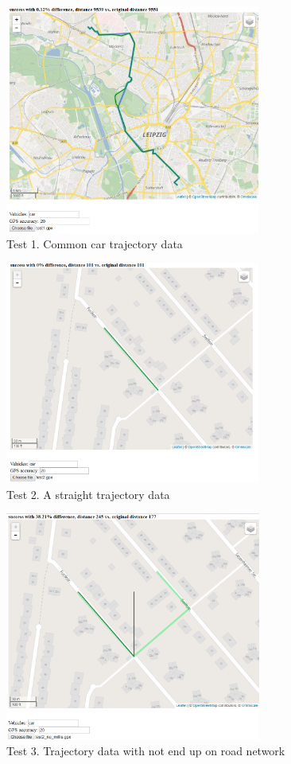 \documentclass[a4paper]{article}
\begin{document}
\begin{figure}
\centering
\includegraphics[width=0.75\textwidth]{fig5.png}
\caption{\label{fig:data} Test 1. Common car trajectory data }
\end{figure}

\begin{figure}
\centering
\includegraphics[width=0.75\textwidth]{fig6.png}
\caption{\label{fig:data} Test 2. A straight trajectory data }
\end{figure}

\begin{figure}
\centering
\includegraphics[width=0.75\textwidth]{fig7.png}
\caption{\label{fig:data} Test 3. Trajectory data with not end up on road network }
\end{figure}
\end{document}
